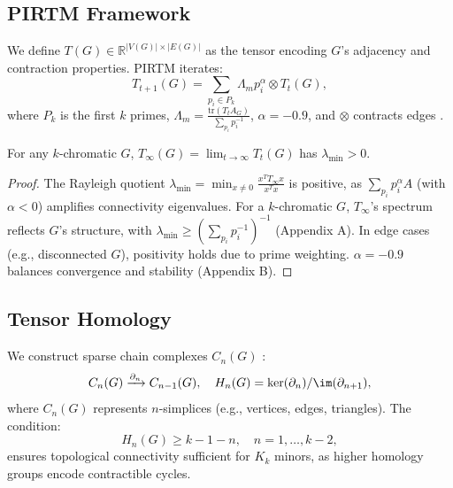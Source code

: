 \documentclass{article}
\theoremstyle{plain}
\begin{document}
\subsection{PIRTM Framework}
We define \( T(G) \in \mathbb{R}^{|V(G)| \times |E(G)|} \) as the tensor encoding \( G \)’s adjacency and contraction properties. PIRTM iterates:
\[
T_{t+1}(G) = \sum_{p_i \in P_k} \Lambda_m p_i^\alpha \otimes T_t(G),
\]
where \( P_k \) is the first \( k \) primes, \( \Lambda_m = \frac{\text{tr}(T_t A_G)}{\sum_{p_i} p_i^{-1}} \), \( \alpha = -0.9 \), and \( \otimes \) contracts edges \cite{greensite2003}.
\begin{proposition}[Proposition 2.1]
For any \( k \)-chromatic \( G \), \( T_\infty(G) = \lim_{t \to \infty} T_t(G) \) has \( \lambda_{\text{min}} > 0 \).
\end{proposition}
\begin{proof}
The Rayleigh quotient \( \lambda_{\text{min}} = \min_{x \neq 0} \frac{x^T T_\infty x}{x^T x} \) is positive, as \( \sum_{p_i} p_i^\alpha A \) (with \( \alpha < 0 \)) amplifies connectivity eigenvalues. For a \( k \)-chromatic \( G \), \( T_\infty \)’s spectrum reflects \( G \)’s structure, with \( \lambda_{\text{min}} \geq (\sum_{p_i} p_i^{-1})^{-1} \) (Appendix A). In edge cases (e.g., disconnected \( G \)), positivity holds due to prime weighting. \( \alpha = -0.9 \) balances convergence and stability (Appendix B).
\end{proof}

\subsection{Tensor Homology}
We construct sparse chain complexes \( C_n(G) \) \cite{munkres1984, davis2006}:
\[
C_n(G) \xrightarrow{\partial_n} C_{n-1}(G), \quad H_n(G) = \ker(\partial_n) / \im(\partial_{n+1}),
\]
where \( C_n(G) \) represents \( n \)-simplices (e.g., vertices, edges, triangles). The condition:
\[
H_n(G) \geq k - 1 - n, \quad n = 1, \ldots, k-2,
\]
ensures topological connectivity sufficient for \( K_k \) minors, as higher homology groups encode contractible cycles.
\end{document}
